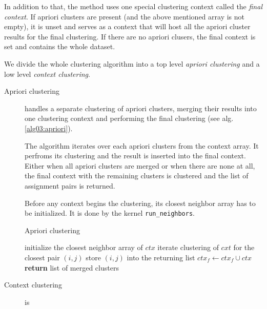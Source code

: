 In addition to that, the method uses one special clustering context called the \emph{final context}. If apriori clusters are present (and the above mentioned array is not empty), it is unset and serves as a context that will host all the apriori cluster results for the final clustering. If there are no apriori clusers, the final context is set and contains the whole dataset.

We divide the whole clustering algorithm into a top level \emph{apriori clustering} and a low level \emph{context clustering}.

\begin{description}
	\item[Apriori clustering] handles a separate clustering of apriori clusters, merging their results into one clustering context and performing the final clustering (see alg. \ref{alg03:apriori}).
	
	The algorithm iterates over each apriori clusters from the context array. It perfroms its clustering and the result is inserted into the final context. Either when all apriori clusters are merged or when there are none at all, the final context with the remaining clusters is clustered and the list of assignment pairs is returned.
	
	Before any context begins the clustering, its closest neighbor array has to be initialized. It is done by the kernel \texttt{run\_neighbors}.
	
	
	\begin{algorithm}
		\caption{Apriori clustering}
		\label{alg03:apriori}
		\begin{algorithmic}[1]
			 
			\State initialize the closest neighbor array of $ctx$ 
			\State iterate clustering of $cxt$ for the closest pair $(i,j)$
			\State store $(i,j)$ into the returning list
			\EndWhile
			\State $ctx_f \gets ctx_f \cup ctx$ 
			\EndFor
			\State \textbf{return} list of merged clusters
			\EndProcedure
		\end{algorithmic}
	\end{algorithm}

	\item[Context clustering] is
	

\end{description}
